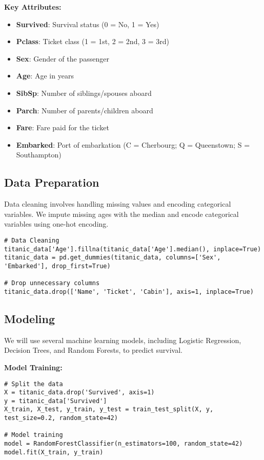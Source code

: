 \documentclass{article}
\begin{document}
\vspace{20pt}
\textbf{Key Attributes:}
\begin{itemize}
    \item \textbf{Survived}: Survival status (0 = No, 1 = Yes)
    \item \textbf{Pclass}: Ticket class (1 = 1st, 2 = 2nd, 3 = 3rd)
    \item \textbf{Sex}: Gender of the passenger
    \item \textbf{Age}: Age in years
    \item \textbf{SibSp}: Number of siblings/spouses aboard
    \item \textbf{Parch}: Number of parents/children aboard
    \item \textbf{Fare}: Fare paid for the ticket
    \item \textbf{Embarked}: Port of embarkation (C = Cherbourg; Q = Queenstown; S = Southampton)
\end{itemize}

\subsection{Data Preparation}
Data cleaning involves handling missing values and encoding categorical variables. We impute missing ages with the median and encode categorical variables using one-hot encoding.

\begin{verbatim}
# Data Cleaning
titanic_data['Age'].fillna(titanic_data['Age'].median(), inplace=True)
titanic_data = pd.get_dummies(titanic_data, columns=['Sex', 'Embarked'], drop_first=True)

# Drop unnecessary columns
titanic_data.drop(['Name', 'Ticket', 'Cabin'], axis=1, inplace=True)
\end{verbatim}

\subsection{Modeling}
We will use several machine learning models, including Logistic Regression, Decision Trees, and Random Forests, to predict survival.

\textbf{Model Training:}
\begin{verbatim}
# Split the data
X = titanic_data.drop('Survived', axis=1)
y = titanic_data['Survived']
X_train, X_test, y_train, y_test = train_test_split(X, y, test_size=0.2, random_state=42)

# Model training
model = RandomForestClassifier(n_estimators=100, random_state=42)
model.fit(X_train, y_train)
\end{verbatim}
\end{document}
